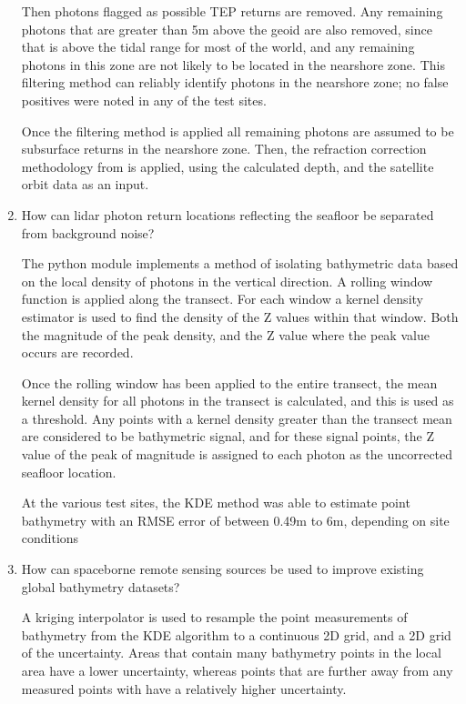 \begin{enumerate}
    Then photons flagged as possible TEP returns  are removed. Any remaining photons that are greater than 5m above the geoid are also removed, since that is above the tidal range for most of the world, and any remaining photons in this zone are not likely to be located in the nearshore zone. 
    This filtering method can reliably identify photons in the nearshore zone; no false positives were noted in any of the test sites. 

    Once the filtering method is applied all remaining photons are assumed to be subsurface returns in the nearshore zone. Then, the refraction correction methodology from \citeauthor{Parrish2019} is applied, using the calculated depth, and the satellite orbit data as an input.


    \item How can lidar photon return locations reflecting the seafloor be separated from background noise?
    
    The python module implements a method of isolating bathymetric data based on the local density of photons in the vertical direction. A rolling window function is applied along the transect. For each window a kernel density estimator is used to find the density of the Z values within that window. Both the magnitude of the peak density, and the Z value where the peak value occurs are recorded.    

    Once the rolling window has been applied to the entire transect, the mean kernel density for all photons in the transect is calculated, and this is used as a threshold. Any points with a kernel density greater than the transect mean are considered to be bathymetric signal, and for these signal points, the Z value of the peak of magnitude is assigned to each photon as the uncorrected seafloor location. 

    At the various test sites, the KDE method was able to estimate point bathymetry with an RMSE error of between 0.49m to 6m, depending on site conditions

    \item How can spaceborne remote sensing sources be used to improve existing global bathymetry datasets?
    
    A kriging interpolator is used to resample the point measurements of bathymetry from the KDE algorithm to a continuous 2D grid, and a 2D grid of the uncertainty. Areas that contain many bathymetry points in the local area have a lower uncertainty, whereas points that are further away from any measured points with have a relatively higher uncertainty.


\end{enumerate}
